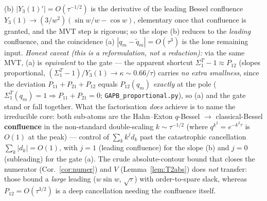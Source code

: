 \begin{remark}[The assembly: $R=O(\tau^{5/2})$ via the q-Bessel stationary-phase asymptotic coupled to the
travel-block phase]
\textup{(b)} $|Y_3(1)'|=O(\tau^{-1/2})$ is the derivative of the leading Bessel confluence
$Y_3(1)\to(3/w^2)(\sin w/w-\cos w)$, elementary once that confluence is granted, and the MVT step is rigorous; so
the slope \textup{(b)} reduces to the \emph{leading} confluence, and the coincidence \textup{(a)}
$|q_m-\tilde q_m|=O(\tau^3)$ is the lone remaining input. \emph{Honest caveat \textup(this is a reformulation,
not a reduction\textup):} via the same MVT, (a) is \emph{equivalent} to the gate --- the apparent shortcut
$\Sigma_1^T-1\approx P_{12}$ (slopes proportional, $(\Sigma_1^T-1)/Y_3(1)\to\kappa\sim0.66/\tau$) carries
\emph{no extra smallness}, since the deviation $P_{11}+P_{21}+P_{12}$ equals $P_{12}(q_m)$ \emph{exactly} at the
pole \textup($\Sigma_1^T(q_m)=1\Rightarrow P_{11}+P_{21}=0$; \texttt{GAPB\_proportional.py}\textup), so (a) and
the gate stand or fall together. What the factorisation \emph{does} achieve is to name the irreducible core: both
sub-atoms are the Hahn--Exton $q$-Bessel $\to$ classical-Bessel \textbf{confluence} in the non-standard
double-scaling $k\sim\tau^{-1/2}$ \textup(where $q^{k^2}=e^{-k^2\tau}$ is $O(1)$ at the peak\textup) --- control
of $\sum_k k^jd_k$ past the catastrophic cancellation $\sum_k|d_k|=O(1)$, with $j=1$ \textup(leading confluence\textup)
for the slope (b) and $j=0$ \textup(subleading\textup) for the gate (a). The crude absolute-contour bound that
closes the numerator (Cor.~\ref{cor:numer}) and $V$ (Lemma~\ref{lem:T2abs}) does \emph{not} transfer: those bound
a \emph{large} leading ($w\sin w$, $\sqrt\tau$) with order-to-spare slack, whereas $P_{12}=O(\tau^{3/2})$ is a deep
cancellation needing the confluence itself.


\end{remark}
